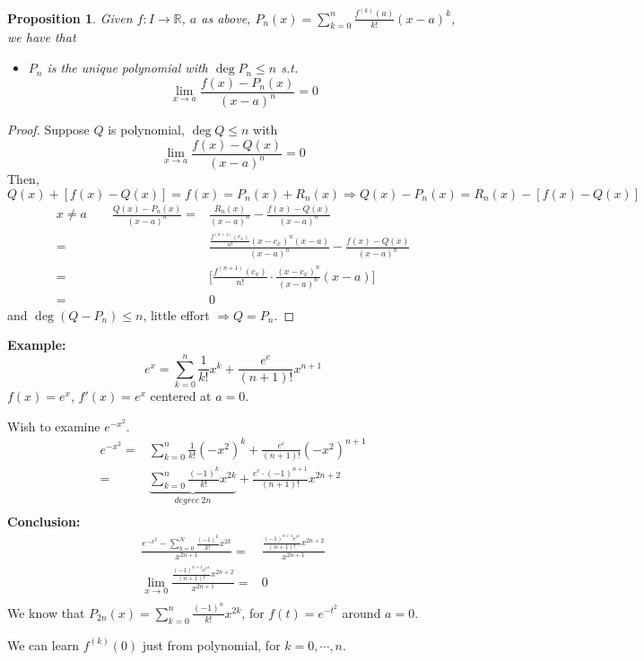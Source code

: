 \documentclass[12pt]{article}
\theoremstyle{plain}
\newtheorem{proposition}{Proposition}[subsection]
\newcommand{\mR}{{\mathbb{R}}}
\begin{document}
\begin{proposition}
Given $f:I\to \mR$, $a$ as above, $P_n(x) = \sum_{k=0}^n
\frac{f^{(k)}(a)}{k!} (x-a)^k$, we have that 
\begin{itemize}
	\item $P_n$ is the unique polynomial with $\deg P_n \leq n$ s.t. 
		\[
			\lim_{x\to a} \frac{f(x) - P_n(x)}{(x-a)^n} = 0
		\]
\end{itemize}
\end{proposition}
\begin{proof}
	Suppose $Q$ is polynomial, $\deg Q \leq n$ with 
	\[
		\lim_{x\to a} \frac{f(x)-Q(x)}{(x-a)^n} = 0
	\]
	Then, 
	\[
		Q(x) + [f(x) - Q(x)] = f(x) = P_n(x) + R_n(x) 
		\Rightarrow Q(x) - P_n(x) = R_n(x) - [f(x) - Q(x)]
	\]
	\begin{align*}
		x\neq a \qquad 
		\frac{Q(x) - P_n(x)}{(x-a)^n} 
		=& \frac{R_n(x)}{(x-a)^n} -\frac{f(x)-Q(x)}{(x-a)^n} \\
		=& \frac{\frac{f^{(n+1)}(c_x)}{n!} (x-c_x)^n (x-a)}{(x-a)^n} 
		-\frac{f(x)- Q(x)}{(x-a)^n}\\
		=& \bigg[ \frac{f^{(n+1)}(c_x)}{n!} \cdot \frac{(x-c_x)^n}{(x-a)^n}
		(x-a)\bigg]\\
		=& 0 
	\end{align*}
	and $\deg(Q- P_n)\leq n$, little effort $\Rightarrow Q= P_n$.
\end{proof}

{\color{Brown}
\textbf{Example: }
\[
	e^x = \sum_{k=0}^n \frac1{k!} x^k + \frac{e^c}{(n+1)!} x^{n+1}
\]
$f(x) = e^x$, $f'(x) = e^x$ centered at $a = 0$. 

Wish to examine $e^{-x^2}$. 
\begin{align*}
	e^{-x^2} 
	=& \sum_{k=0}^n \frac1{k!} (-x^2)^k + \frac{e^c}{(n+1)!} (-x^2)^{n+1}\\
	=& \underbrace{\sum_{k=0}^n \frac{(-1)^k}{k!} x^{2k} }_{degree \ 2n}
	+ \frac{e^c\cdot (-1)^{n+1}}{(n+1)!}x^{2n+2} \\
\end{align*}
\textbf{Conclusion:}
\begin{align*}
	\frac{e^{-x^2} - \sum_{k=0}^N \frac{(-1)^k}{k!}x^{2k}}{x^{2n+1}}
	=& \frac{\frac{(-1)^{n+1}e^{c^k}}{(n+1)!}x^{2n+2}}{x^{2n+1}} \\
	\lim_{x \to 0}  \frac{\frac{(-1)^{n+1}e^{c^k}}{(n+1)!}x^{2n+2}}{x^{2n+1}} 
	=& 0\\
\end{align*}
We know that $P_{2n}(x) = \sum_{k=0}^n \frac{(-1)^n}{k!}x^{2k}$, for 
$f(t)=e^{-t^2}$  around $a = 0$. 

We can learn $f^{(k)}(0)$ just from polynomial, for $k = 0, \cdots, n$.
}
\end{document}
